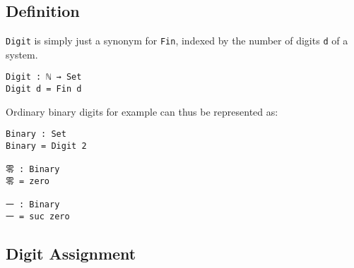 \documentclass[../thesis.tex]{subfiles}
\begin{document}
%
%
\subsection{Definition}

{\lstinline|Digit|} is simply just a synonym for {\lstinline|Fin|}, indexed by
the number of digits {\lstinline|d|} of a system.

\begin{lstlisting}
Digit : ℕ → Set
Digit d = Fin d
\end{lstlisting}

Ordinary binary digits for example can thus be represented as:

\begin{lstlisting}
Binary : Set
Binary = Digit 2

零 : Binary
零 = zero

一 : Binary
一 = suc zero
\end{lstlisting}

\subsection{Digit Assignment}
\end{document}
